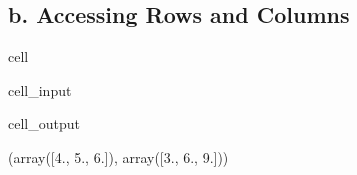 \documentclass[letterpaper,10pt,english]{jupyterBook}
\begin{document}
\subsection{b. Accessing Rows and Columns}
\label{\detokenize{lessons/Intro_to_Matrices_in_NumPy:b-accessing-rows-and-columns}}
\begin{sphinxuseclass}{cell}\begin{sphinxVerbatimInput}

\begin{sphinxuseclass}{cell_input}
\begin{sphinxVerbatim}[commandchars=\\\{\}]
  \PYG{p}{[} \PYG{p}{]}

  \PYG{p}{[} \PYG{p}{]}

 
\end{sphinxVerbatim}

\end{sphinxuseclass}\end{sphinxVerbatimInput}
\begin{sphinxVerbatimOutput}

\begin{sphinxuseclass}{cell_output}
\begin{sphinxVerbatim}[commandchars=\\\{\}]
(array([4., 5., 6.]), array([3., 6., 9.]))
\end{sphinxVerbatim}

\end{sphinxuseclass}\end{sphinxVerbatimOutput}

\end{sphinxuseclass}
\end{document}
